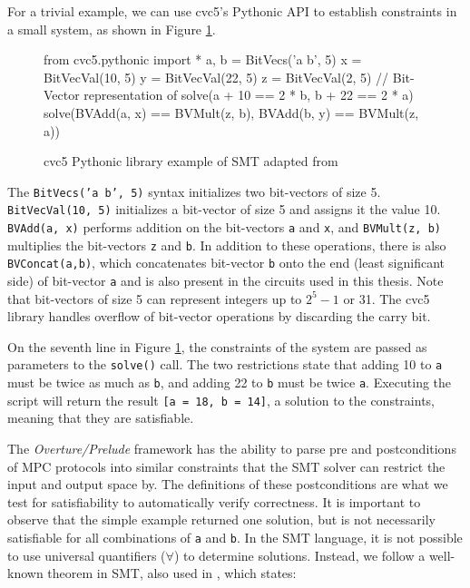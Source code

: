 \documentclass{article}
\begin{document}
For a trivial example, we can use cvc5's Pythonic API to establish constraints in a small system, as shown in Figure \ref{fig-cvc5}. 
\begin{figure}
{\footnotesize
\begin{center}
    \begin{verbatimtab}
    from cvc5.pythonic import *
    a, b = BitVecs('a b', 5)
    x = BitVecVal(10, 5)
    y = BitVecVal(22, 5)
    z = BitVecVal(2, 5)
    // Bit-Vector representation of solve(a + 10 == 2 * b, b + 22 == 2 * a)
    solve(BVAdd(a, x) == BVMult(z, b), BVAdd(b, y) == BVMult(z, a))
    \end{verbatimtab}
\end{center}}
\caption{cvc5 Pythonic library example of SMT adapted from \cite{cvc5-example}}
\label{fig-cvc5}
\end{figure}
The \texttt{BitVecs('a b', 5)} syntax initializes two bit-vectors of size 5. \texttt{BitVecVal(10, 5)} initializes a bit-vector of size 5 and assigns it the value 10. \texttt{BVAdd(a, x)} performs addition on the bit-vectors \texttt{a} and \texttt{x}, and \texttt{BVMult(z, b)} multiplies the bit-vectors \texttt{z} and \texttt{b}. In addition to these operations, there is also \texttt{BVConcat(a,b)}, which concatenates bit-vector \texttt{b} onto the end (least significant side) of bit-vector \texttt{a} and is also present in the circuits used in this thesis. Note that bit-vectors of size 5 can represent integers up to $2^5 - 1$ or 31. The cvc5 library handles overflow of bit-vector operations by discarding the carry bit. 

On the seventh line in Figure \ref{fig-cvc5}, the constraints of the system are passed as parameters to the \texttt{solve()} call. The two restrictions state that adding 10 to \texttt{a} must be twice as much as \texttt{b}, and adding 22 to \texttt{b} must be twice \texttt{a}. Executing the script  will return the result \texttt{[a = 18, b = 14]}, a solution to the constraints, meaning that they are satisfiable.

The \textit{Overture/Prelude} framework has the ability to parse pre and postconditions of MPC protocols into similar constraints that the SMT solver can restrict the input and output space by. The definitions of these postconditions are what we test for satisfiability to automatically verify correctness. It is important to observe that the simple example returned one solution, but is not necessarily satisfiable for all combinations of \texttt{a} and \texttt{b}. In the SMT language, it is not possible to use universal quantifiers ($\forall$) to determine solutions. Instead, we follow a well-known theorem in SMT, also used in \cite{skalka-near-esop25}, which states:
\end{document}
